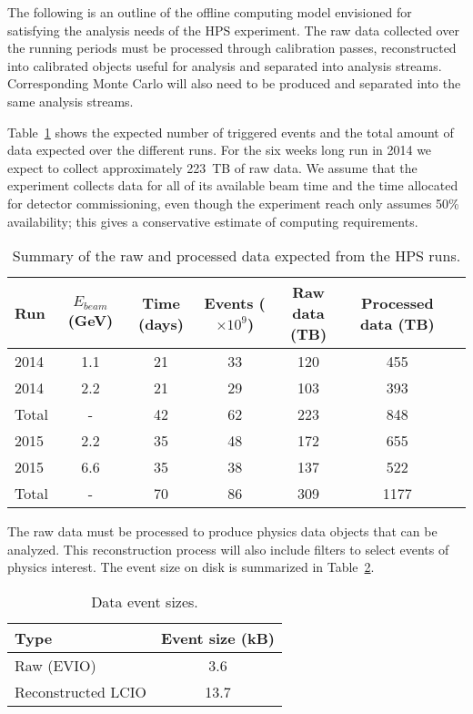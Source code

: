 
The following is an outline of the offline computing model envisioned for satisfying the analysis needs of the HPS experiment. The raw data collected over the running periods must be processed through calibration passes, reconstructed into calibrated objects useful for analysis and separated into analysis streams. Corresponding Monte Carlo will also need to be produced and separated into the same analysis streams.

Table~\ref{tab:data_volume} shows the expected number of triggered events and
the total amount of data expected over the 
different runs. For the six weeks long run in 2014 we expect to collect approximately 223~TB of raw data. 
We assume that the experiment collects data for all of its available beam time and the time allocated for detector commissioning, even though the experiment reach only assumes 50\% availability; this gives a conservative estimate of computing requirements.
\begin{table}[]
\centering
\begin{tabular}{|l|c|c|c|c|c|c|}
\hline
Run & $E_{beam}$ (GeV) & Time (days) & Events ($\times 10^9$) & Raw data (TB) & Processed data (TB)\\
\hline
2014 & 1.1 & 21 & 33 & 120 & 455 \\
2014 & 2.2 & 21 & 29 & 103 & 393  \\
\hline
Total & - & 42 & 62 & 223  & 848 \\
\hline
2015 & 2.2 & 35 & 48 & 172 & 655 \\
2015 & 6.6 & 35 & 38 & 137 & 522 \\
\hline
Total & - & 70 & 86 & 309 & 1177 \\
\hline
\end{tabular}
\caption{{\small Summary of the raw and processed data expected from the HPS runs. }}
\label{tab:data_volume}
\end{table}
The raw data must be processed to produce physics data objects that can be analyzed. This reconstruction process will also include filters to select events of physics interest. The event size on disk is summarized 
in Table~\ref{tab:raw_data_size}. 
\begin{table}[]
\centering
\begin{tabular}{|l|c|}
\hline
Type & Event size (kB) \\ 
\hline
Raw (EVIO)  &  3.6 \\
\hline
Reconstructed LCIO & 13.7 \\
\hline
\end{tabular}
\caption{{\small Data event sizes. }}
\label{tab:raw_data_size}
\end{table}


